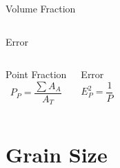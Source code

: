 \documentclass[10pt]{beamer}
\begin{document}
{\begin{frame}[fragile]{Volume Fraction}
\begin{columns}[T,onlytextwidth]
\begin{block}{Error}
\end{block}

\end{columns}

  \begin{columns}[T,onlytextwidth]
\begin{block}{Point Fraction}
\begin{equation*}
P_{P} = \dfrac{\sum A_{A}}{A_{T}}
\end{equation*} 
\end{block}
 

\begin{block}{Error}
\begin{equation*}
E_{P}^{2} = \dfrac{1}{P}
\end{equation*} 
\end{block}

\end{columns}


 
    
\end{frame}
}
\section{Grain Size}
\end{document}
